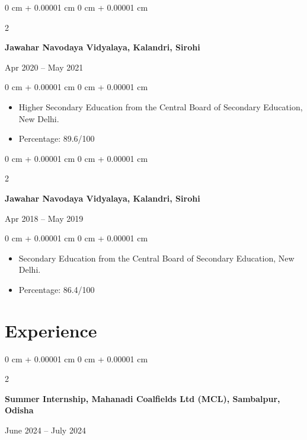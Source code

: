 \documentclass[10pt, letterpaper]{article}
\newenvironment{highlights}{
    \begin{itemize}[
        topsep=0.10 cm,
        parsep=0.10 cm,
        partopsep=0pt,
        itemsep=0pt,
        leftmargin=0 cm + 10pt
    ]
}{
    \end{itemize}
} %
\newenvironment{onecolentry}{
    \begin{adjustwidth}{
        0 cm + 0.00001 cm
    }{
        0 cm + 0.00001 cm
    }
}{
    \end{adjustwidth}
} %
\newenvironment{twocolentry}[2][]{
    \onecolentry
    \def\secondColumn{#2}
    \setcolumnwidth{\fill, 4.5 cm}
    \begin{paracol}{2}
}{
    \switchcolumn \raggedleft \secondColumn
    \end{paracol}
    \endonecolentry
} %
\begin{document}
\begin{twocolentry}{Apr 2020 – May 2021}
    \textbf{Jawahar Navodaya Vidyalaya, Kalandri, Sirohi}
\end{twocolentry}

\vspace{0.10 cm}
\begin{onecolentry}
    \begin{highlights}
        \item Higher Secondary Education from the Central Board of Secondary Education, New Delhi.
        \item Percentage: 89.6/100
    \end{highlights}
\end{onecolentry}

\begin{twocolentry}{Apr 2018 – May 2019}
    \textbf{Jawahar Navodaya Vidyalaya, Kalandri, Sirohi}
\end{twocolentry}

\vspace{0.10 cm}
\begin{onecolentry}
    \begin{highlights}
        \item Secondary Education from the Central Board of Secondary Education, New Delhi.
        \item Percentage: 86.4/100
    \end{highlights}
\end{onecolentry}

\vspace{-0.10 cm}



\vspace{-0.10 cm}
\section{Experience}

\begin{twocolentry}{June 2024 – July 2024}
    \textbf{Summer Internship, Mahanadi Coalfields Ltd (MCL), Sambalpur, Odisha}
\end{twocolentry}

\vspace{0.10 cm}
\end{document}
